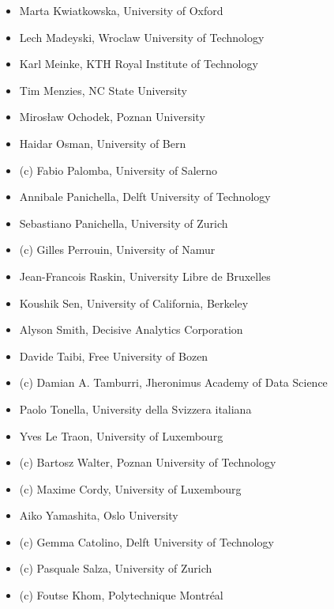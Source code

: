 \begin{itemize}
	\item Marta Kwiatkowska, University of Oxford
	\item Lech Madeyski, Wroclaw University of Technology
	\item Karl Meinke, KTH Royal Institute of Technology
	\item Tim Menzies, NC State University
	\item Mirosław Ochodek, Poznan University
	\item Haidar Osman, University of Bern
	\item (c) Fabio Palomba, University of Salerno
	\item Annibale Panichella, Delft University of Technology
	\item Sebastiano Panichella, University of Zurich
	\item (c) Gilles Perrouin, University of Namur
	\item Jean-Francois Raskin, University Libre de Bruxelles
	\item Koushik Sen, University of California, Berkeley
	\item Alyson Smith, Decisive Analytics Corporation
	\item Davide Taibi, Free University of Bozen
	\item (c) Damian A. Tamburri, Jheronimus Academy of Data Science
	\item Paolo Tonella, University della Svizzera italiana
	\item Yves Le Traon, University of Luxembourg
	\item (c) Bartosz Walter, Poznan University of Technology
	\item (c) Maxime Cordy, University of Luxembourg
	\item Aiko Yamashita, Oslo University
	\item (c) Gemma Catolino, Delft University of Technology
	\item (c) Pasquale Salza, University of Zurich
	\item (c) Foutse Khom, Polytechnique Montréal
\end{itemize}
